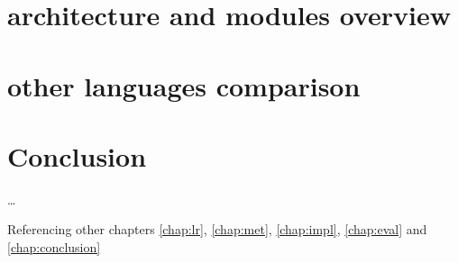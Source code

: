 \section{architecture and modules overview}
\label{}

\section{other languages comparison}
\label{}

\section{Conclusion}



\ldots

Referencing other chapters \ref{chap:lr}, \ref{chap:met}, \ref{chap:impl}, \ref{chap:eval} and \ref{chap:conclusion}
